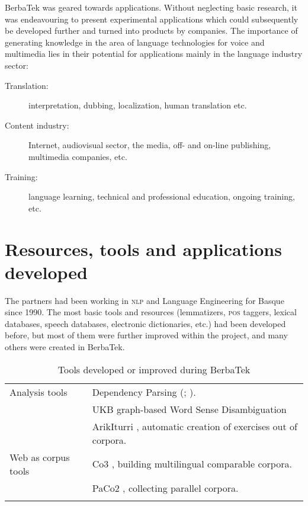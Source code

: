 \documentclass[output=paper]{LSP/langsci}
\begin{document}
BerbaTek was geared towards applications. Without neglecting basic research, it was endeavouring to present experimental applications which could subsequently be developed further and turned into products by companies. The importance of generating knowledge in the area of language technologies for voice and multimedia lies in their potential for applications mainly in the language industry sector:


\begin{description}
\item[Translation:] interpretation, dubbing, localization, human translation etc.
\item[Content industry:] Internet, audiovisual sector, the media, off- and on-line publishing, multimedia companies, etc.
\item[Training:] language learning, technical and professional education, ongoing 
training, etc.
\end{description}

\newpage 
\section{Resources, tools and applications developed}\label{sec:4}

The partners had been working in \textsc{nlp} and Language Engineering for Basque since 1990. The most basic tools and resources (lemmatizers, \textsc{pos} taggers, lexical databases, speech databases, electronic dictionaries, etc.) had been developed before, but most of them were further improved within the project, and many others were created in BerbaTek. 

\begin{table}
\begin{tabularx}{\textwidth}{lX}
\lsptoprule
{Analysis tools} & Dependency Parsing (\citealt{Bengoetxea2010}; \citealt{AgirreEtAl2011}).\\
& UKB \citep{AgirreSoroa2009} graph-based Word Sense Disambiguation\\
& ArikIturri \citep{Aldabe2010}, automatic creation of exercises out of corpora.\\
{Web as corpus tools} & Co3 \citep{LeturiaEtAl2009}, building multilingual comparable corpora.\\
& PaCo2 \citep{SanVicente2012}, collecting parallel corpora.\\
\lspbottomrule
\end{tabularx}
\caption{Tools developed or improved during BerbaTek}
\label{table:leturia:2}
\end{table}
\end{document}
